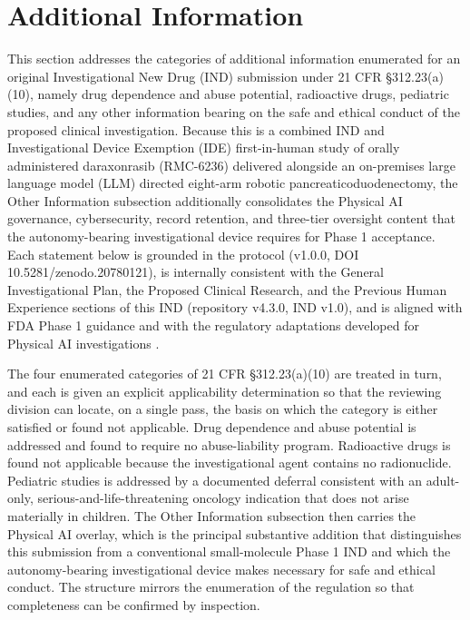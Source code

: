 \section{Additional Information}

This section addresses the categories of additional information enumerated for an
original Investigational New Drug (IND) submission under 21 CFR \S 312.23(a)(10),
namely drug dependence and abuse potential, radioactive drugs, pediatric studies,
and any other information bearing on the safe and ethical conduct of the proposed
clinical investigation. Because this is a combined IND and Investigational Device
Exemption (IDE) first-in-human study of orally administered daraxonrasib
(RMC-6236) delivered alongside an on-premises large language model (LLM) directed
eight-arm robotic pancreaticoduodenectomy, the Other Information subsection
additionally consolidates the Physical AI governance, cybersecurity, record
retention, and three-tier oversight content that the autonomy-bearing
investigational device requires for Phase 1 acceptance. Each statement below is
grounded in the protocol (v1.0.0, DOI 10.5281/zenodo.20780121), is internally
consistent with the General Investigational Plan, the Proposed Clinical Research,
and the Previous Human Experience sections of this IND (repository v4.3.0, IND
v1.0), and is aligned with FDA Phase 1 guidance \cite{phase1guidance} and with the
regulatory adaptations developed for Physical AI investigations
\cite{cfr312paiuni,cfr050paiuni,ichpaistduni}.

The four enumerated categories of 21 CFR \S 312.23(a)(10) are treated in turn, and
each is given an explicit applicability determination so that the reviewing
division can locate, on a single pass, the basis on which the category is either
satisfied or found not applicable. Drug dependence and abuse potential is addressed
and found to require no abuse-liability program. Radioactive drugs is found not
applicable because the investigational agent contains no radionuclide. Pediatric
studies is addressed by a documented deferral consistent with an adult-only,
serious-and-life-threatening oncology indication that does not arise materially in
children. The Other Information subsection then carries the Physical AI overlay,
which is the principal substantive addition that distinguishes this submission from
a conventional small-molecule Phase 1 IND and which the autonomy-bearing
investigational device makes necessary for safe and ethical conduct. The structure
mirrors the enumeration of the regulation so that completeness can be confirmed by
inspection.

